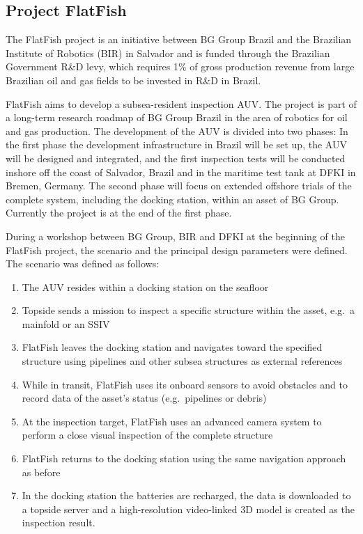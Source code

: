 \documentclass[conference]{IEEEtran}
\begin{document}
\subsection{Project FlatFish}

The FlatFish project is an initiative between BG Group Brazil and the Brazilian Institute
of Robotics (BIR) in Salvador and is funded through the Brazilian Government R\&D levy,
which requires 1\% of gross production revenue from large Brazilian oil and gas
fields to be invested in R\&D in Brazil.

FlatFish aims to develop a subsea-resident inspection AUV. The project is part
of a long-term research roadmap of BG Group Brazil in the area of robotics for oil and gas
production. The development of the AUV is divided into two phases: In the first phase the
development infrastructure in Brazil will be set up, the AUV will be designed and
integrated, and the first inspection tests will be conducted inshore off the coast of
Salvador, Brazil and in the maritime test tank at DFKI in Bremen, Germany. The second
phase will focus on extended offshore trials of the complete system, including the
docking station, within an asset of BG Group. Currently the project is at the end of the
first phase.

During a workshop between BG Group, BIR and DFKI at the beginning of the FlatFish project, the
scenario and the principal design parameters were defined. The scenario was defined as follows:

\begin{enumerate}
    \item The AUV resides within a docking station on the seafloor
    \item Topside sends a mission to inspect a specific structure within the asset,
        e.g.~a mainfold or an SSIV
    \item FlatFish leaves the docking station and navigates toward the specified structure using
        pipelines and other subsea structures as external references
    \item While in transit, FlatFish uses its onboard sensors to avoid obstacles and to record data of the asset's status (e.g.~pipelines or debris)
    \item At the inspection target, FlatFish uses an advanced camera system to perform a close
        visual inspection of the complete structure
    \item FlatFish returns to the docking station using the same navigation approach as before
    \item In the docking station the batteries are recharged, the data is downloaded to
        a topside server and a high-resolution video-linked 3D model is created as the inspection
        result.
\end{enumerate}
\end{document}
